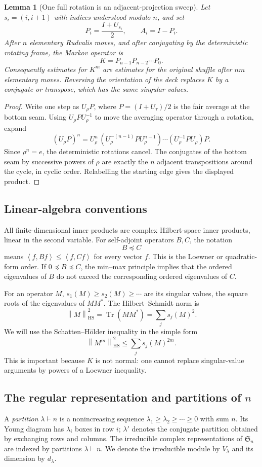 \documentclass[11pt]{article}
\newtheorem{lemma}[theorem]{Lemma}
\theoremstyle{remark}
\newcommand{\Sn}{\mathfrak S_n}
\newcommand{\Tr}{\operatorname{Tr}}
\newcommand{\HS}{\operatorname{HS}}
\newcommand{\norm}[1]{\left\lVert #1\right\rVert}
\newcommand{\ip}[2]{\left\langle #1,#2\right\rangle}
\begin{document}
\begin{lemma}[One full rotation is an adjacent-projection sweep]\label{lem:sweepdecomp}
Let $s_i=(i,i+1)$ with indices understood modulo $n$, and set
\[
 P_i=\frac{I+U_{s_i}}2,\qquad A_i=I-P_i.
\]
After $n$ elementary Rudvalis moves, and after conjugating by the deterministic rotating frame, the Markov operator is
\[
 K=P_{n-1}P_{n-2}\cdots P_0.
\]
Consequently estimates for $K^m$ are estimates for the original shuffle after $nm$ elementary moves.  Reversing the orientation of the deck replaces $K$ by a conjugate or transpose, which has the same singular values.
\end{lemma}
\begin{proof}
Write one step as $U_\rho P$, where $P=(I+U_\tau)/2$ is the fair average at the bottom seam.  Using $U_\rho P U_\rho^{-1}$ to move the averaging operator through a rotation, expand
\[
 (U_\rho P)^n
 =U_\rho^n\,(U_\rho^{-(n-1)}PU_\rho^{n-1})\cdots(U_\rho^{-1}PU_\rho)P.
\]
Since $\rho^n=e$, the deterministic rotations cancel.  The conjugates of the bottom seam by successive powers of $\rho$ are exactly the $n$ adjacent transpositions around the cycle, in cyclic order.  Relabelling the starting edge gives the displayed product.
\end{proof}

\subsection{Linear-algebra conventions}
All finite-dimensional inner products are complex Hilbert-space inner products, linear in the second variable.  For self-adjoint operators $B,C$, the notation
\[
 B\preceq C
\]
means $\ip f{Bf}\le\ip f{Cf}$ for every vector $f$.  This is the Loewner or quadratic-form order.  If $0\preceq B\preceq C$, the min--max principle implies that the ordered eigenvalues of $B$ do not exceed the corresponding ordered eigenvalues of $C$.

For an operator $M$, $s_1(M)\ge s_2(M)\ge\cdots$ are its singular values, the square roots of the eigenvalues of $MM^*$.  The Hilbert--Schmidt norm is
\[
 \norm M_{\HS}^2=\Tr(MM^*)=\sum_j s_j(M)^2.
\]
We will use the Schatten--H\"older inequality in the simple form
\[
 \norm{M^m}_{\HS}^2\le \sum_j s_j(M)^{2m}.
\]
This is important because $K$ is not normal: one cannot replace singular-value arguments by powers of a Loewner inequality.

\subsection{The regular representation and partitions of $n$}\label{sec:repprimer}
A \emph{partition} $\lambda\vdash n$ is a nonincreasing sequence
$\lambda_1\ge\lambda_2\ge\cdots\ge0$ with sum $n$.  Its Young diagram has $\lambda_i$ boxes in row $i$; $\lambda'$ denotes the conjugate partition obtained by exchanging rows and columns.  The irreducible complex representations of $\Sn$ are indexed by partitions $\lambda\vdash n$.  We denote the irreducible module by $V_\lambda$ and its dimension by $d_\lambda$.
\end{document}
